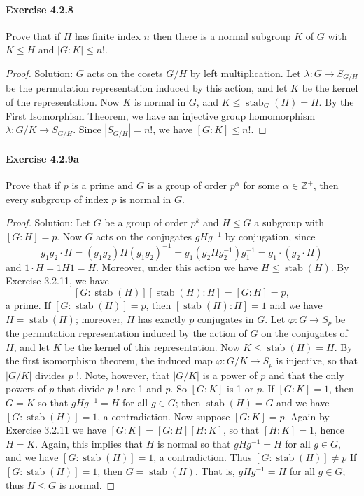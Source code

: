 \documentclass{article}
\theoremstyle{definition}
\begin{document}
\paragraph{Exercise 4.2.8} Prove that if $H$ has finite index $n$ then there is a normal subgroup $K$ of $G$ with $K \leq H$ and $|G: K| \leq n!$.
\begin{proof}
    Solution: $G$ acts on the cosets $G / H$ by left multiplication. Let $\lambda: G \rightarrow S_{G / H}$ be the permutation representation induced by this action, and let $K$ be the kernel of the representation.
Now $K$ is normal in $G$, and $K \leq \operatorname{stab}_G(H)=H$. By the First Isomorphism Theorem, we have an injective group homomorphism $\bar{\lambda}: G / K \rightarrow S_{G / H}$. Since $\left|S_{G / H}\right|=n !$, we have $[G: K] \leq n !$.
\end{proof}


\paragraph{Exercise 4.2.9a} Prove that if $p$ is a prime and $G$ is a group of order $p^{\alpha}$ for some $\alpha \in \mathbb{Z}^{+}$, then every subgroup of index $p$ is normal in $G$.
\begin{proof}
    Solution: Let $G$ be a group of order $p^k$ and $H \leq G$ a subgroup with $[G: H]=p$. Now $G$ acts on the conjugates $g H g^{-1}$ by conjugation, since
$$
g_1 g_2 \cdot H=\left(g_1 g_2\right) H\left(g_1 g_2\right)^{-1}=g_1\left(g_2 H g_2^{-1}\right) g_1^{-1}=g_1 \cdot\left(g_2 \cdot H\right)
$$
and $1 \cdot H=1 H 1=H$. Moreover, under this action we have $H \leq \operatorname{stab}(H)$. By Exercise 3.2.11, we have
$$
[G: \operatorname{stab}(H)][\operatorname{stab}(H): H]=[G: H]=p,
$$
a prime.
If $[G: \operatorname{stab}(H)]=p$, then $[\operatorname{stab}(H): H]=1$ and we have $H=\operatorname{stab}(H)$; moreover, $H$ has exactly $p$ conjugates in $G$. Let $\varphi: G \rightarrow S_p$ be the permutation representation induced by the action of $G$ on the conjugates of $H$, and let $K$ be the kernel of this representation. Now $K \leq \operatorname{stab}(H)=H$. By the first isomorphism theorem, the induced map $\bar{\varphi}: G / K \rightarrow S_p$ is injective, so that $|G / K|$ divides $p$ !. Note, however, that $|G / K|$ is a power of $p$ and that the only powers of $p$ that divide $p$ ! are 1 and $p$. So $[G: K]$ is 1 or $p$. If $[G: K]=1$, then $G=K$ so that $g H g^{-1}=H$ for all $g \in G$; then $\operatorname{stab}(H)=G$ and we have $[G: \operatorname{stab}(H)]=1$, a contradiction. Now suppose $[G: K]=p$. Again by Exercise $3.2$.11 we have $[G: K]=[G: H][H: K]$, so that $[H: K]=1$, hence $H=K$. Again, this implies that $H$ is normal so that $g H g^{-1}=H$ for all $g \in G$, and we have $[G: \operatorname{stab}(H)]=1$, a contradiction. Thus $[G: \operatorname{stab}(H)] \neq p$
If $[G: \operatorname{stab}(H)]=1$, then $G=\operatorname{stab}(H)$. That is, $g H g^{-1}=H$ for all $g \in G$; thus $H \leq G$ is normal.
\end{proof}
\end{document}
